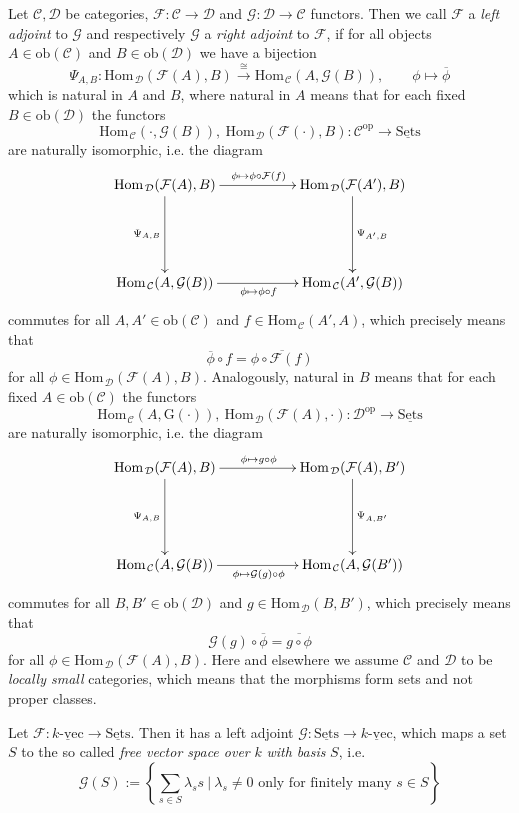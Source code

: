 \documentclass[11pt]{book}
\numberwithin{dummy}{section}
\theoremstyle{nonumberbreak}
\newenvironment{defin}[1][]{\ifthenelse{\equal{#1}{}}{\definition}{\definition[#1]}\rm}{\enddefinition}
\newenvironment{ex}[1][]{\ifthenelse{\equal{#1}{}}{\example}{\example[#1]}\rm}{\endexample}
\newcommand{\Hom}{\mathrm{Hom}\hspace{1pt}}
\newcommand{\sets}{\underline{\mathrm{Sets}}}
\newcommand{\kvec}{\underline{k\textrm{-}\mathrm{vec}}}
\newcommand{\C}{\mathcal{C}}
\newcommand{\D}{\mathcal{D}}
\newcommand{\F}{\mathcal{F}}
\newcommand{\G}{\mathcal{G}}
\newcommand{\obc}{\mathrm{ob}(\mathcal{C})}
\newcommand{\la}{\longrightarrow}
\begin{document}
\begin{spacing}{1.4}
\begin{defin}    %
Let $\C, \D$ be categories, $\F: \C \la \D$ and $\G: \D \la \C$ functors. Then we call $\F$ a \textit{left adjoint} to $\G$ and respectively $\G$ a \textit{right adjoint} to $\F$, if for all objects $A \in \obc$ and $B \in \mathrm{ob}(\D)$ we have a bijection
$$\Psi_{A,B}: \Hom_{\D}(\F(A), B) \overset{\cong}{\la} \Hom_{\C}(A, \G(B)), \qquad \phi \mapsto \overline{\phi}$$
which is natural in $A$ and $B$, where natural in $A$ means that for each fixed $B \in \mathrm{ob}(\D)$ the functors 
$$\Hom_{\C}(\cdot, \G(B)), \ \Hom_{\D}(\F(\cdot), B): \mathcal{C}^{\mathrm{op}} \la \sets$$ are naturally isomorphic, i.e. the diagram
$$
\begin{xy}
\xymatrix{
\Hom_{\D}(\F(A), B) \ar[rr]^{\phi \mapsto \phi \circ \F(f)} \ar[dd]_{\Psi_{A,B}} && \Hom_{\D}(\F(A'),B) \ar[dd]^{\Psi_{A',B}} \\&&\\ \Hom_{\C}(A,\G(B)) \ar[rr]_{\phi \mapsto \phi \circ f} && \Hom_{\C}(A', \G(B))
}
\end{xy}
$$
commutes for all $A,A' \in \obc$ and $f \in \Hom_{\C}(A',A)$, which precisely means that 
$$\overline{\phi} \circ f = \overline{ \phi \circ \F(f)}$$
for all $\phi \in \Hom_{\D}(\F(A), B)$. Analogously, natural in $B$ means that for each fixed $A \in \mathrm{ob}(\C)$ the functors
$$\Hom_{\C}(A, \mathrm{G}(\cdot)), \ \Hom_{\D}(\F(A), \cdot): \mathcal{D}^{\mathrm{op}} \la \sets$$
are naturally isomorphic, i.e. the diagram
$$
\begin{xy}
\xymatrix{
\Hom_{\D}(\F(A), B) \ar[dd]_{\Psi_{A,B}} \ar[rr]^{\phi \mapsto g \circ \phi } && \Hom_{\D}(\F(A), B') \ar[dd]^{\Psi_{A,B'}} \\&&\\ \Hom_{\C}(A, \G(B)) \ar[rr]_{\phi \mapsto  \G(g) \circ \phi} && \Hom_{\C}(A, \G(B'))
}
\end{xy}
$$
commutes for all $B,B' \in \mathrm{ob}(\D)$ and $g \in \Hom_{\D}(B,B')$, which precisely means that 
$$\G(g) \circ \overline{\phi} = \overline{g \circ \phi}$$
for all $\phi \in \Hom_{\D}(\F(A), B)$.
Here and elsewhere we assume $\C$ and $\D$ to be \textit{locally small} categories, which means that the morphisms form sets and not proper classes.
\end{defin}


\begin{ex}   %
\begin{compactenum}
\item Let $\F: \kvec \la \sets$. Then it has a left adjoint $\G: \sets \la \kvec$, which maps a set $S$ to the so called \textit{free vector space over} $k$ \textit{with basis} $S$, i.e. 
$$\G(S) := \left\{ \sum_{s \in S} \lambda_s s \ \vert \ \lambda_s \neq 0 \textrm{ only for finitely many } s \in S \right\}$$


\end{compactenum}
\end{ex}
\end{spacing}
\end{document}
